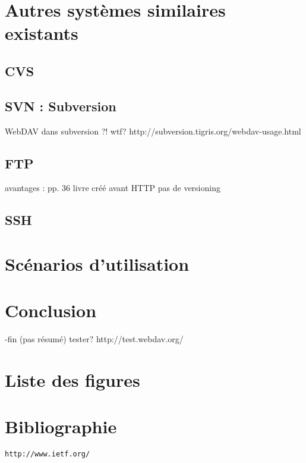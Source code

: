 \documentclass[a4paper, 11pt]{article}
\begin{document}
{%
\section{Autres systèmes similaires existants}
	\subsection{CVS}
	\subsection{SVN : Subversion}
		WebDAV dans subversion ?! wtf?
		http://subversion.tigris.org/webdav-usage.html
	\subsection{FTP}
		avantages : pp. 36 livre
		créé avant HTTP
		pas de versioning
	\subsection{SSH}
\section{Scénarios d'utilisation}

\section{Conclusion}
-fin (pas résumé)
tester? http://test.webdav.org/

\section{Liste des figures}

\section{Bibliographie} %
%
\begin{Verbatim}
http://www.ietf.org/
\end{Verbatim}
	
}
\end{document}
